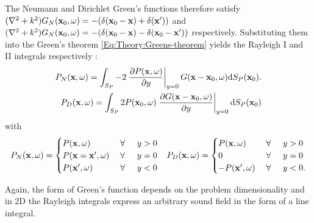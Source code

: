The Neumann and Dirichlet Green's functions therefore satisfy $(\nabla^2+k^2)G_N(\mathbf{x}_0,\omega) = -(\delta(\mathbf{x}_0-\mathbf{x}) + \delta(\mathbf{x}'))$ and $(\nabla^2+k^2)G_N(\mathbf{x}_0,\omega) = -(\delta(\mathbf{x}_0-\mathbf{x})  - \delta(\mathbf{x}_0-\mathbf{x}'))$ respectively. Substituting them into the Green's theorem \eqref{Eq:Theory:Greens-theorem} yields the Rayleigh I and II integrals respectively \cite{Berkhout1984}:
\begin{eqnarray}
P_N(\mathbf{x},\omega) =
\int_{S_P}
-2
\left. \frac{\partial P(\mathbf{x},\omega)}{\partial y} \right|_{y = 0} 
G(\mathbf{x}-\mathbf{x}_0,\omega) \mathrm{d} S_P ( \mathbf{x}_0).
\\
P_D(\mathbf{x},\omega) =
\int_{S_P}
2 P(\mathbf{x}_0,\omega)  
\left. \frac{\partial G(\mathbf{x}-\mathbf{x}_0,\omega)}{\partial y} \right|_{y = 0} 
\mathrm{d} S_P ( \mathbf{x}_0)
\end{eqnarray}
with
\begin{align*}
P_N(\mathbf{x},\omega) = \begin{cases} 
P(\mathbf{x},\omega)           & \hspace{1mm} \forall \hspace{5mm}  y>0  	     \\
P(\mathbf{x} = \mathbf{x}',\omega) 			& \hspace{1mm} \forall \hspace{5mm}  y=0  \\
P(\mathbf{x}',\omega) 			& \hspace{1mm} \forall \hspace{5mm}  y<0
\end{cases}
&&
P_D(\mathbf{x},\omega) = \begin{cases} 
P(\mathbf{x},\omega)           & \hspace{1mm} \forall \hspace{5mm}  y>0  	     \\
0 			& \hspace{1mm} \forall \hspace{5mm}  y=0  \\
-P(\mathbf{x}',\omega) 			& \hspace{1mm} \forall \hspace{5mm}  y<0.
\end{cases}
\end{align*}

Again, the form of Green's function depends on the problem dimensionality and in 2D the Rayleigh integrals express an arbitrary sound field in the form of a line integral.

